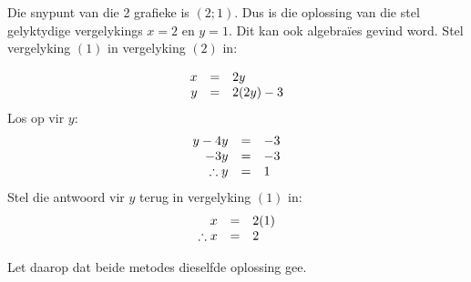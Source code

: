 Die snypunt van die 2 grafieke is $(2;1)$. Dus is die oplossing van die stel gelyktydige vergelykings $x=2$ en $y=1$.
Dit kan ook algebraïes gevind word. 
Stel vergelyking $(1)$ in vergelyking $(2)$ in:

\begin{equation*}
\begin{array}{ccl}\hfill x& =& 2y\hfill \\
 \hfill y& =& 2(2y)-3\hfill 
\end{array}
\end{equation*}
Los op vir $y$:
\begin{equation*}
\begin{array}{ccl}
 \hfill y-4y& =& -3\hfill \\
 \hfill -3y& =& -3\hfill \\ 
\hfill \therefore y& =& 1\hfill 
\end{array}
\end{equation*}
Stel die antwoord vir $y$ terug in vergelyking $(1)$ in:
\begin{equation*}
\begin{array}{ccl}
 \hfill x& =& 2(1)\hfill \\
 \therefore x&=& 2\hfill \end{array}
\end{equation*}

Let daarop dat beide metodes dieselfde oplossing gee.

